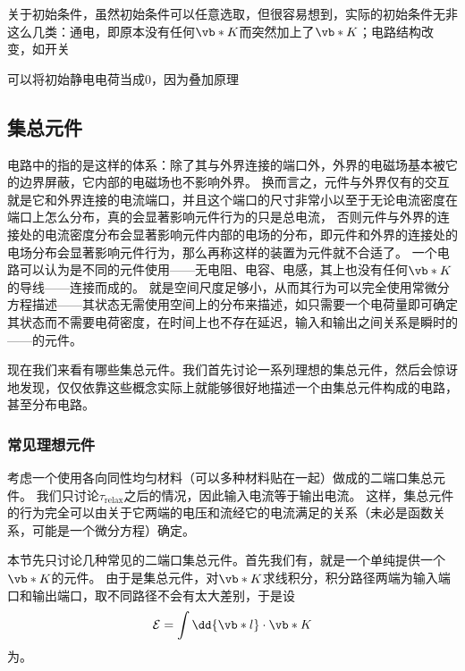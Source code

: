关于初始条件，虽然初始条件可以任意选取，但很容易想到，实际的初始条件无非这么几类：通电，即原本没有任何$\vb*{K}$而突然加上了$\vb*{K}$；电路结构改变，如开关


可以将初始静电电荷当成0，因为叠加原理 %

\subsection{集总元件}

电路中的指的是这样的体系：除了其与外界连接的端口外，外界的电磁场基本被它的边界屏蔽，它内部的电磁场也不影响外界。
换而言之，元件与外界仅有的交互就是它和外界连接的电流端口，并且这个端口的尺寸非常小以至于无论电流密度在端口上怎么分布，真的会显著影响元件行为的只是总电流，
否则元件与外界的连接处的电流密度分布会显著影响元件内部的电场的分布，即元件和外界的连接处的电场分布会显著影响元件行为，那么再称这样的装置为元件就不合适了。
一个电路可以认为是不同的元件使用——无电阻、电容、电感，其上也没有任何$\vb*{K}$的导线——连接而成的。
就是空间尺度足够小，从而其行为可以完全使用常微分方程描述——其状态无需使用空间上的分布来描述，如只需要一个电荷量即可确定其状态而不需要电荷密度，在时间上也不存在延迟，输入和输出之间关系是瞬时的——的元件。

现在我们来看有哪些集总元件。我们首先讨论一系列理想的集总元件，然后会惊讶地发现，仅仅依靠这些概念实际上就能够很好地描述一个由集总元件构成的电路，甚至分布电路。

\subsubsection{常见理想元件}


考虑一个使用各向同性均匀材料（可以多种材料贴在一起）做成的二端口集总元件。
我们只讨论$\tau_\text{relax}$之后的情况，因此输入电流等于输出电流。
这样，集总元件的行为完全可以由关于它两端的电压和流经它的电流满足的关系（未必是函数关系，可能是一个微分方程）确定。

本节先只讨论几种常见的二端口集总元件。首先我们有，就是一个单纯提供一个$\vb*{K}$的元件。
由于是集总元件，对$\vb*{K}$求线积分，积分路径两端为输入端口和输出端口，取不同路径不会有太大差别，于是设
\begin{equation}
    \mathcal{E} = \int \dd{\vb*{l}} \cdot \vb*{K}
\end{equation}
为。

